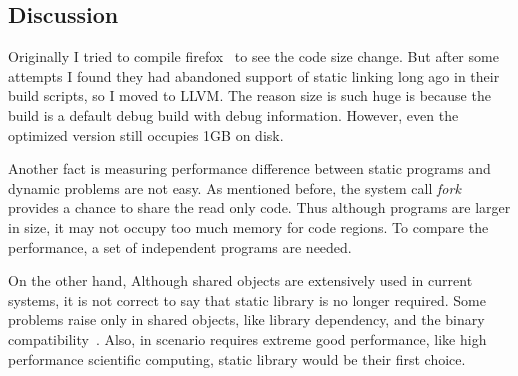 \subsection{Discussion}
Originally I tried to compile firefox~\cite{firefox} to see the code size
change. But after some attempts I found they had abandoned support of static linking 
long ago in their build scripts, so I moved to LLVM. The reason size is such huge
is because the build is a default debug build with debug information. However,
even the optimized version still occupies 1GB on disk.

Another fact is measuring performance difference between static programs and
dynamic problems are not easy. As mentioned before, the system call \emph{fork}
provides a chance to share the read only code. Thus although programs are
larger in size, it may not occupy too much memory for code regions. To compare
the performance, a set of independent programs are needed.

On the other hand, Although shared objects are extensively used in current
systems, it is not correct to say that static library is no longer required.
Some problems raise only in shared objects, like library dependency, and the
binary compatibility~\cite{dllhell}. Also, in scenario requires extreme good
performance, like high performance scientific computing, static library would
be their first choice. 
